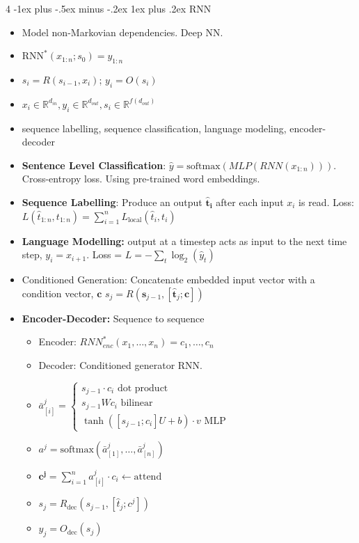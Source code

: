\documentclass[10pt, landscape]{article}
\makeatletter
\renewcommand{\subsubsection}{\@startsection{subsubsection}{3}{0mm}%
  {-1ex plus -.5ex minus -.2ex}%
  {1ex plus .2ex}%
{\normalfont\small\bfseries}}%
\makeatother
\begin{document}
\begin{multicols*}{4}
  \subsubsection{RNN}
  \begin{itemize}
    \item Model non-Markovian dependencies. Deep NN.
    \item $\text{RNN}^*(x_{1:n};s_0) = y_{1:n}$
    \item $s_i = R(s_{i-1}, x_i)$; \space \space $y_i = O(s_i)$
    \item $x_i \in \mathbb{R}^{d_{in}}, y_i \in \mathbb{R}^{d_{out}}, s_i \in \mathbb{R}^{f(d_{out})}$
    \item sequence labelling, sequence classification, language modeling, encoder-decoder
    \item \textbf{Sentence Level Classification}: $\hat{y} = \text{softmax}(MLP(RNN(x_{1:n})))$. Cross-entropy loss. Using pre-trained word embeddings.
    \item \textbf{Sequence Labelling}: Produce an output $\mathbf{\hat{t}_i}$ after each input $x_i$ is read. Loss: $L(\hat{t}_{1:n}, t_{1:n}) = \sum_{i=1}^{n} L_{\text{local}}(\hat{t}_{i}, t_{i})$
    \item \textbf{Language Modelling:} output at a timestep acts as input to the next time step, $y_i = x_{i+1}$. Loss = $L = - \sum_t \log_2 (\hat{y}_t)$
    \item Conditioned Generation: Concatenate embedded input vector with a condition vector, $\mathbf{c}$ $s_j = R(\mathbf{s}_{j-1}, [\hat{\mathbf{t}}_j; \mathbf{c}])$
    \item \textbf{Encoder-Decoder:} Sequence to sequence
    \begin{itemize}
      \item Encoder: $RNN_{enc}^* (x_1,\dots,x_n) = c_1,\dots,c_n$
      \item Decoder: Conditioned generator RNN.
      \item $\bar{a}^j_{[i]} = \begin{cases} s_{j-1}\cdot c_i \text{  dot product}\\ s_{j-1}Wc_i \text{  bilinear}\\ \tanh([s_{j-1};c_i]U +b)\cdot v \text{  MLP} \end{cases}$
      \item $a^j = \text{softmax}(\bar{a}_{[1]}^j, \dots, \bar{a}_{[n]}^j)$
      \item $\mathbf{c^j} = \sum_{i=1}^n a_{[i]}^j \cdot c_i \leftarrow \text{attend}$
      \item $s_j = R_{\text{dec}}(s_{j-1}, [\hat{t}_j;c^j])$
      \item $y_j = O_{\text{dec}}(s_j)$
    \end{itemize}
  \end{itemize}


\end{multicols*}
\end{document}
